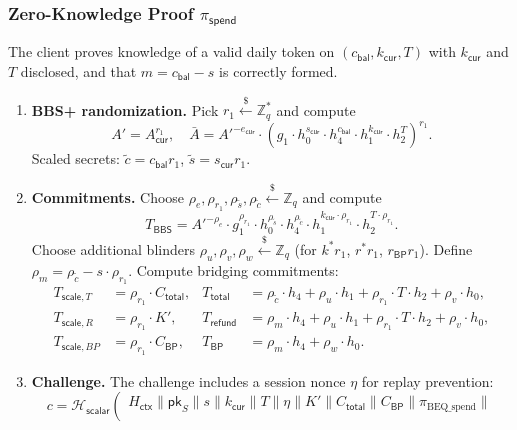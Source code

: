 \documentclass[11pt]{article}
\theoremstyle{definitionstyle}
\theoremstyle{plain}
\begin{document}
\subsubsection{Zero-Knowledge Proof $\pi_{\mathsf{spend}}$}
The client proves knowledge of a valid daily token on $(c_{\mathsf{bal}}, k_{\mathsf{cur}}, T)$ with $k_{\mathsf{cur}}$ and $T$ disclosed, and that $m = c_{\mathsf{bal}} - s$ is correctly formed.

\begin{enumerate}[leftmargin=*]
\item \textbf{BBS+ randomization.}
  Pick $r_1 \xleftarrow{\$} \mathbb{Z}_q^*$ and compute
  \[
  A' = A_{\mathsf{cur}}^{r_1}, \quad
  \bar{A} = A'^{-e_{\mathsf{cur}}} \cdot \left( g_1 \cdot h_0^{s_{\mathsf{cur}}} \cdot h_4^{c_{\mathsf{bal}}} \cdot h_1^{k_{\mathsf{cur}}} \cdot h_2^{T} \right)^{r_1}.
  \]
  Scaled secrets: $\tilde{c} = c_{\mathsf{bal}} r_1$, $\tilde{s} = s_{\mathsf{cur}} r_1$.
\item \textbf{Commitments.}
  Choose $\rho_e, \rho_{r_1}, \rho_{\tilde{s}}, \rho_{\tilde{c}} \xleftarrow{\$} \mathbb{Z}_q$ and compute
  \[
  T_{\mathsf{BBS}} = A'^{-\rho_e} \cdot g_1^{\rho_{r_1}} \cdot h_0^{\rho_{\tilde{s}}} \cdot h_4^{\rho_{\tilde{c}}} \cdot h_1^{k_{\mathsf{cur}} \cdot \rho_{r_1}} \cdot h_2^{T \cdot \rho_{r_1}}.
  \]
  Choose additional blinders $\rho_u, \rho_v, \rho_w \xleftarrow{\$} \mathbb{Z}_q$ (for $k^* r_1$, $r^* r_1$, $r_{\mathsf{BP}} r_1$).
  Define $\rho_m = \rho_{\tilde{c}} - s \cdot \rho_{r_1}$.
  Compute bridging commitments:
  \begin{align*}
    T_{\mathsf{scale},T} &= \rho_{r_1} \cdot C_{\mathsf{total}}, & T_{\mathsf{total}} &= \rho_{\tilde{c}} \cdot h_4 + \rho_u \cdot h_1 + \rho_{r_1} \cdot T \cdot h_2 + \rho_v \cdot h_0, \\
    T_{\mathsf{scale},R} &= \rho_{r_1} \cdot K', & T_{\mathsf{refund}} &= \rho_m \cdot h_4 + \rho_u \cdot h_1 + \rho_{r_1} \cdot T \cdot h_2 + \rho_v \cdot h_0, \\
    T_{\mathsf{scale},BP} &= \rho_{r_1} \cdot C_{\mathsf{BP}}, & T_{\mathsf{BP}} &= \rho_m \cdot h_4 + \rho_w \cdot h_0.
  \end{align*}
\item \textbf{Challenge.}
  The challenge includes a session nonce $\eta$ for replay prevention:
  \[
  c = \mathcal{H}_{\mathsf{scalar}}\left(
  \begin{array}{c}
  H_{\mathsf{ctx}} \parallel \mathsf{pk}_S \parallel s \parallel k_{\mathsf{cur}} \parallel T \parallel \eta \parallel K' \parallel C_{\mathsf{total}} \parallel C_{\mathsf{BP}} \parallel \pi_{\text{BEQ\_spend}} \parallel \\

\end{array}\]
\end{enumerate}
\end{document}
